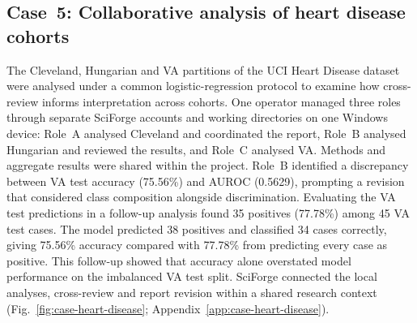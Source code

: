 \subsection{Case~5: Collaborative analysis of heart disease cohorts}
\noindent The Cleveland, Hungarian and VA partitions of the UCI Heart Disease dataset were analysed under a common logistic-regression protocol to examine how cross-review informs interpretation across cohorts. One operator managed three roles through separate SciForge accounts and working directories on one Windows device: Role~A analysed Cleveland and coordinated the report, Role~B analysed Hungarian and reviewed the results, and Role~C analysed VA. Methods and aggregate results were shared within the project. Role~B identified a discrepancy between VA test accuracy (75.56\%) and AUROC (0.5629), prompting a revision that considered class composition alongside discrimination. Evaluating the VA test predictions in a follow-up analysis found 35 positives (77.78\%) among 45 VA test cases. The model predicted 38 positives and classified 34 cases correctly, giving 75.56\% accuracy compared with 77.78\% from predicting every case as positive. This follow-up showed that accuracy alone overstated model performance on the imbalanced VA test split. SciForge connected the local analyses, cross-review and report revision within a shared research context (Fig.~\ref{fig:case-heart-disease}; Appendix~\ref{app:case-heart-disease}).

